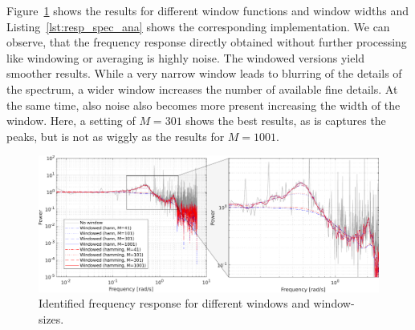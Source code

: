 \documentclass{scrartcl}
\begin{document}
Figure~\ref{fig:resp_spec_ana} shows the results for different window functions and window widths and Listing~\ref{lst:resp_spec_ana} shows the corresponding implementation.
We can observe, that the frequency response directly obtained without further processing like windowing or averaging is highly noise.
The windowed versions yield smoother results.
While a very narrow window leads to blurring of the details of the spectrum, a wider window increases the number of available fine details.
At the same time, also noise also becomes more present increasing the width of the window.
Here, a setting of $M=301$ shows the best results, as is captures the peaks, but is not as wiggly as the results for $M=1001$.
\begin{figure}[h]
	\centering
	\includegraphics[width=\textwidth]{figures/freq_resp_spec_ana.pdf}
	\caption{Identified frequency response for different windows and window-sizes.}
	\label{fig:resp_spec_ana}
\end{figure}
\end{document}
